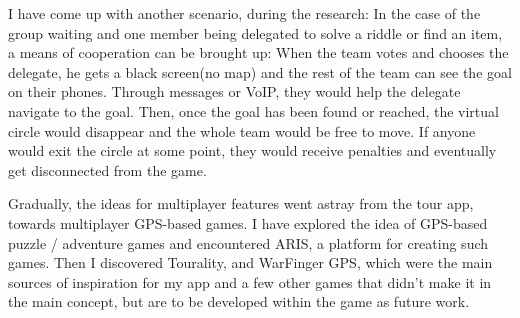 \documentclass{article}
\begin{document}
I have come up with another scenario, during the research: In the case of the
group waiting and one member being delegated to solve a riddle or find an item,
a means of cooperation can be brought up: When the team votes and chooses the
delegate, he gets a black screen(no map) and the rest of the team can see
the goal on their phones. Through messages or VoIP, they would help the delegate
navigate to the goal. Then, once the goal has been found or reached, the virtual
circle would disappear and the whole team would be free to move. If anyone would
exit the circle at some point, they would receive penalties and eventually get
disconnected from the game.\newline

Gradually, the ideas for multiplayer features went astray from the tour app,
towards multiplayer GPS-based games. I have explored the idea of GPS-based
puzzle / adventure games and encountered ARIS, a platform for creating such
games. Then I discovered Tourality, and WarFinger GPS, which were the main
sources of inspiration for my app and a few other games that didn't make it in
the main concept, but are to be developed within the game as future
work.\newline
\end{document}
